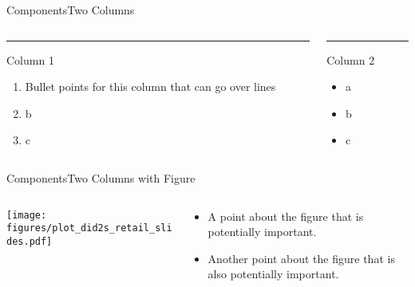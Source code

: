 \documentclass[aspectratio=169,t,11pt,table]{beamer}
\begin{document}
\begin{frame}{Components}{Two Columns}
  \begin{columns}[T]
    \begin{column}{.50\textwidth}
      \vspace{0pt}
      {\color{accent}\rule{\linewidth}{2pt}}
      Column 1

      \begin{enumerate}
        \item Bullet points for this column that can go over lines
        \item b
        \item c
      \end{enumerate}
    \end{column}
    
    \hfill
    
    \begin{column}{.50\textwidth}
      {\color{accent}\rule{\linewidth}{2pt}}
      Column 2

      \begin{itemize}
        \item a
        \item b
        \item c
      \end{itemize}
    \end{column}
  \end{columns}
\end{frame}

\begin{frame}{Components}{Two Columns with Figure}
  \begin{columns}[T]
    \begin{column}{.54\textwidth}
      \texttt{[image: figures/plot\_did2s\_retail\_slides.pdf]}
    \end{column}
    \hfill
    \begin{column}{.46\textwidth}
      \begin{itemize}
      \item A point about the figure that is potentially important.
      \item Another point about the figure that is also potentially important.
      \end{itemize}
    \end{column}
  \end{columns}
\end{frame}

\end{document}
